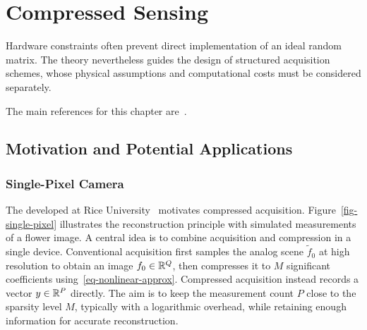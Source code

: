 
\chapter{Compressed Sensing}
\label{chap-cs}

Hardware constraints often prevent direct implementation of an ideal random matrix. The theory nevertheless guides the design of structured acquisition schemes, whose physical assumptions and computational costs must be considered separately.

The main references for this chapter are~\cite{mallat2008wavelet,foucart2013mathematical,scherzer2009variational}.

\section{Motivation and Potential Applications}


\subsection{Single-Pixel Camera}

The  developed at Rice University~\cite{DuarteSinglePixel} motivates compressed acquisition. Figure~\ref{fig-single-pixel} illustrates the reconstruction principle with simulated measurements of a flower image.
%
A central idea is to combine acquisition and compression in a single device. Conventional acquisition first samples the analog scene $\tilde f_0$ at high resolution to obtain an image $f_0\in\mathbb{R}^Q$, then compresses it to $M$ significant coefficients using~\eqref{eq-nonlinear-approx}. Compressed acquisition instead records a vector $y\in\mathbb{R}^P$ directly. The aim is to keep the measurement count $P$ close to the sparsity level $M$, typically with a logarithmic overhead, while retaining enough information for accurate reconstruction.

